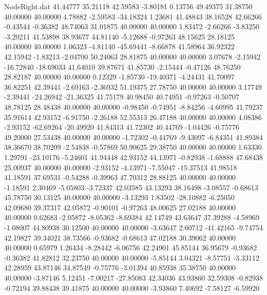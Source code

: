 \begin{filecontents}{NodeRight.dat}
  41.44777   35.21118   42.59583    -3.80181    0.13756   49.49375   31.38750   40.00000   40.00000    4.78882   -2.59583  -34.18324    1.23681
  41.48843   38.16528   42.66266    -0.43544   -0.36382   48.74063   31.01875   40.00000   40.00000    1.83472   -2.66266   -3.83250   -3.20211
  41.53898   38.93677   44.81140    -5.12688   -0.97263   48.15625   28.18125   40.00000   40.00000    1.06323   -4.81140  -45.69441   -8.66878
  41.58964   36.92322   42.15942    -1.83213   -2.04700   50.24063   28.81875   40.00000   40.00000    3.07678   -2.15942  -16.72840  -18.69033
  41.64010   39.87671   41.85730    -2.15444   -0.47126   48.76250   28.82187   40.00000   40.00000    0.12329   -1.85730  -19.40371   -4.24431
  41.70097   36.82251   42.39441    -2.69163   -2.36932   51.19375   27.78750   40.00000   40.00000    3.17749   -2.39441  -24.26942  -21.36325
  41.75179   40.98450   40.74951    -0.97263   -0.50707   48.78125   28.48438   40.00000   40.00000   -0.98450   -0.74951   -8.84256   -4.60995
  41.79237   35.91614   42.93152    -6.91750   -2.26188   52.55313   26.47188   40.00000   40.00000    4.08386   -2.93152  -62.69264  -20.49920
  41.84313   41.72302   40.44769    -1.04426   -0.75776   49.20000   27.53438   40.00000   40.00000   -1.72302   -0.44769   -9.43097   -6.84351
  41.89384   38.36670   38.70209    -2.54838   -0.57869   50.90625   29.38750   40.00000   40.00000    1.63330    1.29791  -23.10176   -5.24601
  41.94448   42.93152   44.13971    -0.82938   -1.68888   47.68438   25.00937   40.00000   40.00000   -2.93152   -4.13971   -7.55047  -15.37513
  41.98518   41.18591   37.69531    -0.54288   -0.39963   47.70312   28.88125   40.00000   40.00000   -1.18591    2.30469   -5.05803   -3.72337
  42.03585   43.13293   38.16498    -3.08557   -0.68613   45.78750   30.13125   40.00000   40.00000   -3.13293    1.83502  -28.10882   -6.25050
  42.09680   39.37317   42.05872    -0.90101   -0.97263   48.00625   27.02188   40.00000   40.00000    0.62683   -2.05872   -8.05362   -8.69384
  42.14749   43.63647   37.39288    -4.58969   -1.08007   44.80938   30.12500   40.00000   40.00000   -3.63647    2.60712  -41.42165   -9.74754
  42.19827   39.34021   38.73566    -0.93682   -0.68613   47.02188   30.39062   40.00000   40.00000    0.65979    1.26434   -8.28442   -6.06756
  42.24901   45.85144   36.95679    -0.93682   -0.36382   41.82812   32.23750   40.00000   40.00000   -5.85144    3.04321   -8.57751   -3.33112
  42.28959   43.87146   34.87549    -0.75776   -3.01394   40.85938   35.38750   40.00000   40.00000   -3.87146    5.12451   -7.00217  -27.85083
  42.34036   43.93860   32.59308    -0.82938   -0.72194   39.88438   39.41875   40.00000   40.00000   -3.93860    7.40692   -7.58127   -6.59920

\end{filecontents}
